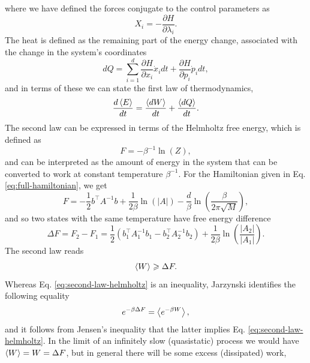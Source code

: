 \documentclass[prx,onecolumn,floatfix,longbibliography,notitlepage, nofootinbib]{revtex4-1}
\renewcommand{\geq}{\geqslant}
\begin{document}
\begin{appendix}
where we have defined the forces conjugate to the control parameters as 
\begin{equation}
    X_i = - \frac{\partial H}{\partial \lambda_i}.
\end{equation}
The heat is defined as the remaining part of the energy change, associated with the change in the system's coordinates
\begin{equation}
    dQ = \sum_{i=1}^d \frac{\partial H}{\partial x_i} \dot{x}_i dt + \frac{\partial H}{\partial p_i} \dot{p}_i dt ,
 \end{equation}
and in terms of these we can state the first law of thermodynamics,
\begin{equation}
    \frac{d \braket{E}}{dt} = \frac{\braket{dW}}{dt} + \frac{\braket{dQ}}{dt}.
\end{equation}
The second law can be expressed in terms of the Helmholtz free energy, which is defined as \cite{callen1998thermodynamics}
\begin{equation}
    F = -\beta^{-1} \ln(Z),
\end{equation}
and can be interpreted as the amount of energy in the system that can be converted to work at constant temperature $\beta^{-1}$. For the Hamiltonian given in Eq. \eqref{eq:full-hamiltonian}, we get
\begin{equation}
    F = -\frac{1}{2} b^\intercal A^{-1} b+ \frac{1}{2\beta} \ln \left(\left| A\right| \right) -\frac{d}{\beta} \ln\left(\frac{\beta}{2\pi \sqrt{M}}\right),
\end{equation}
and so two states with the same temperature have free energy difference
\begin{equation}
    \Delta F = F_2 - F_1 = \frac{1}{2}(b_1^\intercal A_1^{-1}b_1-b_2^\intercal A_2^{-1}b_2) + \frac{1}{2\beta} \ln \left( \frac{\left|A_2\right|}{\left|A_1\right|}\right).
\end{equation}
The second law reads
\begin{equation}
\label{eq:second-law-helmholtz}
    \braket{W} \geq \Delta F.
\end{equation}
Whereas Eq. \eqref{eq:second-law-helmholtz} is an inequality, Jarzynski identifies the following equality \cite{jarzynski1997nonequilibrium}
\begin{equation}
\label{eq:jarzynski-relation}
    e^{-\beta \Delta F} = \Braket{e^{-\beta W}},
\end{equation}
and it follows from Jensen's inequality \cite{jarzynski2011equalities} that the latter implies Eq. \eqref{eq:second-law-helmholtz}. In the limit of an infinitely slow (quasistatic) process we would have $\braket{W} = W =  \Delta F$, but in general there will be some excess (dissipated) work,

\end{appendix}
\end{document}
